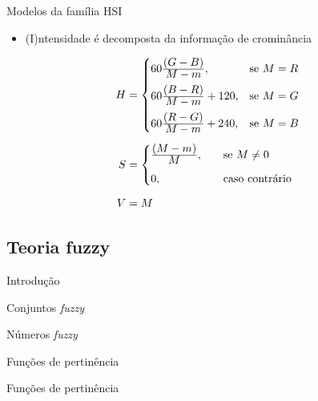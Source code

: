 \begin{frame}{Modelos da família HSI}
\begin{itemize}
    \item  (I)ntensidade é decomposta da informação de crominância
\end{itemize}
\begin{align}
\begin{split}
  H &=  \begin{cases}
            60\frac{\displaystyle (G - B)}{\displaystyle M - m}, & \text{se}\ M = R\\[0.7em]
            60\frac{\displaystyle (B - R)}{\displaystyle M - m} + 120, & \text{se}\ M = G\\[0.7em]
            60\frac{\displaystyle (R - G)}{\displaystyle M - m} + 240, & \text{se}\ M = B
       \end{cases}
  \\[0.5em]
  S &=  \begin{cases}
            \frac{\displaystyle (M - m)}{\displaystyle M}, \quad &\text{se}\ M \neq 0\\[0.7em]
            0, \quad &\text{caso contrário}\\
       \end{cases}
  \\[0.5em]
  V &= M
\end{split}
\end{align}
\end{frame}

\subsection{Teoria fuzzy}
\begin{frame}{Introdução}
\end{frame}

\begin{frame}{Conjuntos \emph{fuzzy}}
\end{frame}

\begin{frame}{Números \emph{fuzzy}}
\end{frame}

\begin{frame}{Funções de pertinência}
\end{frame}

\begin{frame}{Funções de pertinência}
\end{frame}

